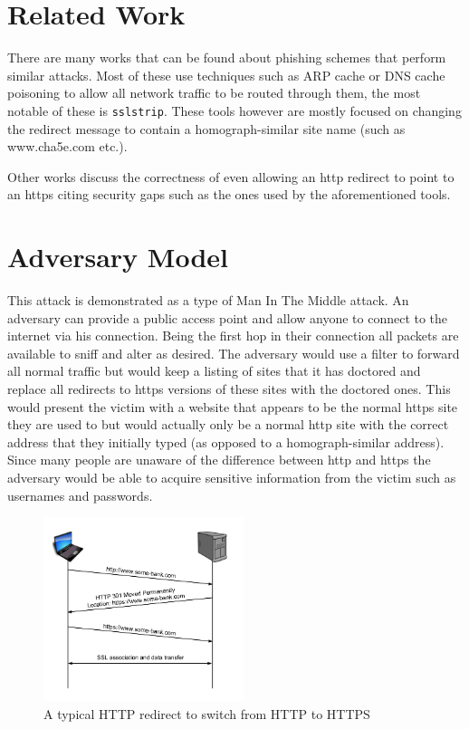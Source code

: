 \documentclass{article}
\begin{document}
\section{Related Work}
There are many works that can be found about phishing schemes that perform similar attacks.  Most of these use techniques such as ARP cache or DNS cache poisoning to allow all network traffic to be routed through them, the most notable of these is \texttt{sslstrip}\cite{sslstrip}.  These tools however are mostly focused on changing the redirect message to contain a homograph-similar site name (such as www.cha5e.com etc.).

Other works discuss the correctness of even allowing an http redirect to point to an https citing security gaps such as the ones used by the aforementioned tools.

\section{Adversary Model}
This attack is demonstrated as a type of Man In The Middle attack.  An adversary can provide a public access point and allow anyone to connect to the internet via his connection.  Being the first hop in their connection all packets are available to sniff and alter as desired.  The adversary would use a filter to forward all normal traffic but would keep a listing of sites that it has doctored and replace all redirects to https versions of these sites with the doctored ones.  This would present the victim with a website that appears to be the normal https site they are used to but would actually only be a normal http site with the correct address that they initially typed (as opposed to a homograph-similar address).  Since many people are unaware of the difference between http and https the adversary would be able to acquire sensitive information from the victim such as usernames and passwords.

\begin{figure}[t]
\begin{center}

\includegraphics[width=2.3in]{normal_redirect.png} 
\caption{A typical HTTP redirect to switch from HTTP to HTTPS} 
\label{fg:redirect}

\end{center}
\end{figure}
\end{document}

